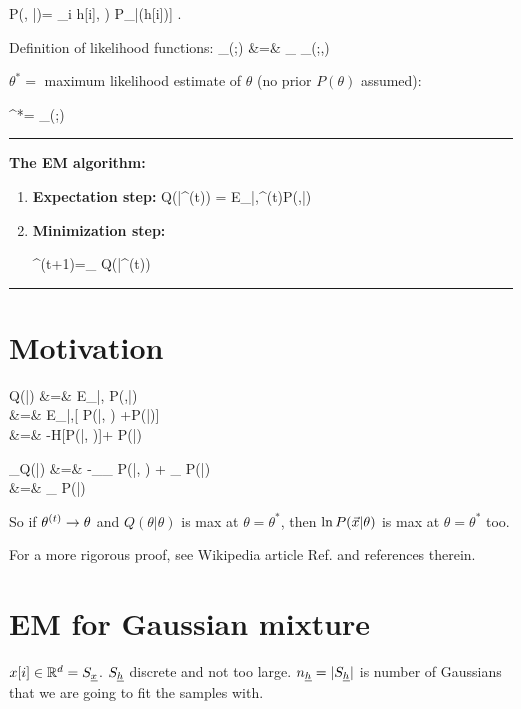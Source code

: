 \beq
P(\vecx, \vech|\theta)=
\prod_i \left[P_{\rvx|\rvh,\ul{\theta}}
(x[i]\cond h[i], \theta)
P_{\rvh|\ul{\theta}}(h[i]\cond \theta)\right]
\;.
\eeq

Definition of likelihood functions:
\beqa
{}
_{\call(\theta;\vecx)}
&=&
\sum_{\vech}
_{\call(\theta;\vecx,\vech)}
\eeqa


$\theta^*=$ maximum likelihood
estimate of $\theta$ (no prior $P(\theta)$
assumed):

\beq
\theta^*=
_\theta\call(\theta;\vecx)
\eeq

\hrule\noindent
{\bf The EM algorithm:}
\begin{enumerate}
\item{\bf Expectation step:} 
\beq
Q(\theta|\theta^{(t)})
=
E_{\vech|\vecx,\theta^{(t)}}\ln P(\vecx,\vech|\theta)
\eeq

\item{\bf Minimization step:}

\beq
\theta^{(t+1)}=_\theta 
Q(\theta|\theta^{(t)})
\eeq
\end{enumerate}
\hrule
\section*{Motivation}

\beqa
Q(\theta|\theta)
&=&
E_{\vech|\vecx,\theta}
\ln P(\vecx,\vech|\theta)
\\
&=&
E_{\vech|\vecx,\theta}[
\ln P(\vech|\vecx, \theta) 
+\ln P(\vecx|\theta)]
\\
&=&
-H[P(\ul{\vech}|\vecx, \theta)]+
\ln P(\vecx|\theta)
\eeqa

\beqa
\partial_\theta Q(\theta|\theta)
&=&
-\sum_{\vech}\partial_\theta
P(\ul{\vech}|\vecx, \theta)
+
\partial_\theta
\ln P(\vecx|\theta)
\\
&=&
\partial_\theta
\ln P(\vecx|\theta)
\eeqa

So if $\theta^{(t)}\rightarrow \theta$
and $Q(\theta|\theta)$ is max at $\theta=\theta^*$,
then $\ln P({\vec{x}}|\theta)$
is max at $\theta=\theta^*$ too.

For a  more rigorous proof,
see Wikipedia article Ref.\cite{wiki-em}
and references therein.

\section*{EM for Gaussian mixture}

$x[i]\in { \mathbb{R}}^d=S_{\underline{x}}$. $S_{\underline{h}}$ discrete and
not too large. $n_{\underline{h}}=|S_{\underline{h}}|$ is
number of Gaussians that we are 
going to fit the samples with.

